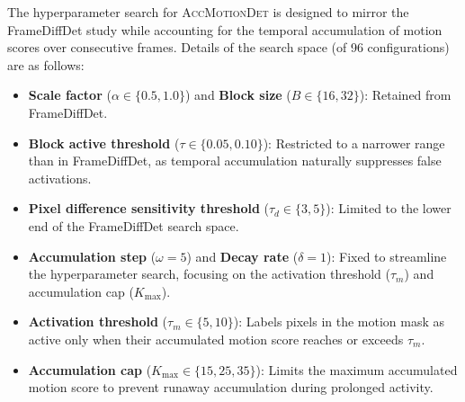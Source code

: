 \documentclass[final,3p,times,twocolumn]{elsarticle}
\begin{document}
\begin{table}[t]
\caption{Representative \textsc{AccMotionDet} hyperparameter
configurations and their corresponding validation-set performance.
Note that the ``Recall (\%)'' column displays the retained recall
alongside the absolute recall drop relative to the baseline in
parentheses, i.e., Recall (-Recall Drop). The best and second-best
results for each metric are highlighted in \textbf{bold} and
\textit{\underline{italic underline}}, respectively. Note that
Accumulation Step $\omega=5$ and Decay rate $\delta=1$ are fixed across
all configurations.}
\label{tb:val_results_accMotionDet}
\end{table}

The hyperparameter search for \textsc{AccMotionDet} is designed to
mirror the FrameDiffDet study while accounting for the temporal
accumulation of motion scores over consecutive frames. Details of the
search space (of 96 configurations) are as follows:

\begin{itemize}
\item \textbf{Scale factor} ($\alpha \in \{0.5, 1.0\}$) and \textbf{Block
size} ($B \in \{16, 32\}$): Retained from FrameDiffDet.
\item \textbf{Block active threshold} ($\tau \in \{0.05, 0.10\}$):
Restricted to a narrower range than in FrameDiffDet, as temporal
accumulation naturally suppresses false activations.
\item \textbf{Pixel difference sensitivity threshold} ($\tau_d \in
\{3, 5\}$): Limited to the lower end of the FrameDiffDet search space.
\item \textbf{Accumulation step} ($\omega=5$) and \textbf{Decay rate}
($\delta=1$): Fixed to streamline the hyperparameter search, focusing
on the activation threshold ($\tau_m$) and accumulation cap
($K_{\max}$).
\item \textbf{Activation threshold} ($\tau_m \in \{5, 10\}$): Labels
pixels in the motion mask as active only when their accumulated motion
score reaches or exceeds $\tau_m$.
\item \textbf{Accumulation cap} ($K_{\max} \in \{15, 25, 35\}$): Limits
the maximum accumulated motion score to prevent runaway accumulation
during prolonged activity.
\end{itemize}
\end{document}
